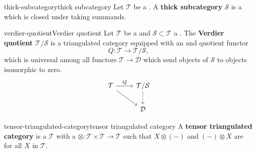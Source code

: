 \begin{topic}{thick-subcategory}{thick subcategory}
    Let $\mathcal{T}$ be a . A \textbf{thick subcategory} $\mathcal{S}$ is a   which is closed under taking summands.
\end{topic}

\begin{topic}{verdier-quotient}{Verdier quotient}
    Let $\mathcal{T}$ be a  and $\mathcal{S} \subset \mathcal{T}$ a . The \textbf{Verdier quotient} $\mathcal{T}/\mathcal{S}$ is a triangulated category equipped with an  and  quotient functor
    \[ Q : \mathcal{T} \to \mathcal{T}/\mathcal{S} , \]
    which is universal among all functors $\mathcal{T} \to \mathcal{D}$ which send objects of $\mathcal{S}$ to objects isomorphic to zero.
    \[ \begin{tikzcd} \mathcal{T} \arrow{r}{Q} \arrow{rd} & \mathcal{T} / \mathcal{S} \arrow[dashed]{d} \\ & \mathcal{D} \end{tikzcd} \]
\end{topic}

    

\begin{topic}{tensor-triangulated-category}{tensor triangulated category}
    A \textbf{tensor triangulated category} is a  $\mathcal{T}$ with a  $\otimes : \mathcal{T} \times \mathcal{T} \to \mathcal{T}$ such that $X \otimes (-)$ and $(-) \otimes X$ are  for all $X$ in $\mathcal{T}$.
\end{topic}
